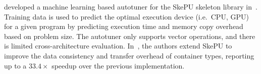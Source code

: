 \documentclass[nonatbib,preprint,9pt]{sigplanconf}
\begin{document}
\citeauthor{Dastgeer2011} developed a machine learning based autotuner
for the SkePU skeleton library in~\cite{Dastgeer2011}. Training data
is used to predict the optimal execution device (i.e.\ CPU, GPU) for a
given program by predicting execution time and memory copy overhead
based on problem size. The autotuner only supports vector operations,
and there is limited cross-architecture
evaluation. In~\cite{Dastgeer2015a}, the authors extend SkePU to
improve the data consistency and transfer overhead of container types,
reporting up to a $33.4\times$ speedup over the previous
implementation.




\end{document}

